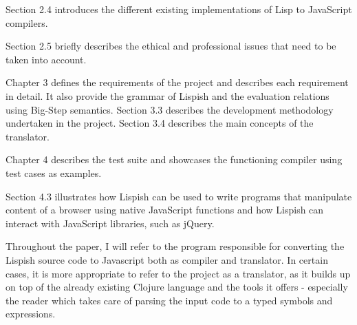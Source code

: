 \documentclass[11pt]{informatics-report}
\begin{document}
Section 2.4 introduces the different existing implementations of Lisp to JavaScript compilers.

Section 2.5 briefly describes the ethical and professional issues that need to be taken into account. 

Chapter 3 defines the requirements of the project and describes each requirement in detail. It also provide the grammar of Lispish and the evaluation relations using Big-Step semantics. 
Section 3.3 describes the development methodology undertaken in the project.
Section 3.4 describes the main concepts of the translator.

Chapter 4 describes the test suite and showcases the functioning compiler using test cases as examples. 

Section 4.3 illustrates how Lispish can be used to write programs that manipulate content of a browser using native JavaScript functions and how Lispish can interact with JavaScript libraries, such as jQuery.

Throughout the paper, I will refer to the program responsible for converting the Lispish source code to Javascript both as compiler and translator.
In certain cases, it is more appropriate to refer to the project as a translator, as it builds up on top of the already existing Clojure language and the tools it offers - especially the reader which takes care of parsing the input code to a typed symbols and expressions.









\nocite{*}




%
%
\end{document}
